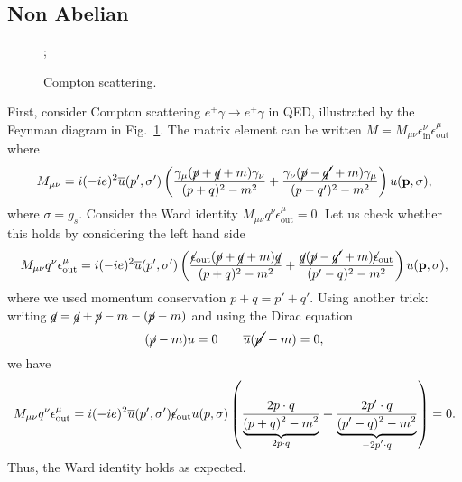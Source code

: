 
\subsection{Non Abelian}%
\label{sub:non_abelian}

\begin{figure}[tbhp]
  \centering
  ;
  \caption{Compton scattering.}
  \label{fig:compton}
\end{figure}
First, consider Compton scattering $e^+ \gamma \to e^+ \gamma$ in QED, illustrated by the Feynman diagram in Fig.~\ref{fig:compton}.
The matrix element can be written $M = M_{\mu\nu} \epsilon^{\nu}_{\text{in}} \epsilon^{\mu} _{\text{out}}$ where
\begin{equation}
  M_{\mu\nu} = i (-i e)^2 \overline{u}{}(p', \sigma') \left( \frac{\gamma_{\mu}(\cancel{p} + \cancel{q} + m)\gamma_{\nu}}{(p + q)^2 - m^2} + \frac{\gamma_{\nu}(\cancel{p} - \cancel{q'} + m)\gamma_{\mu}}{(p - q')^2 - m^2} \right) u(\vb{p}, \sigma),
\end{equation}
where $\sigma = g_s$.
Consider the Ward identity $M_{\mu\nu} q^{\nu} \epsilon^{\mu} _{\text{out}} = 0$.
Let us check whether this holds by considering the left hand side
\begin{equation}
  M_{\mu\nu} q^{\nu} \epsilon^{\mu} _{\text{out}} = i (-i e)^2 \overline{u}{}(p', \sigma') 
  \left( \frac{\cancel{\epsilon}_{\text{out}}(\cancel{p} + \cancel{q} + m)\cancel{q}}{(p + q)^2 - m^2} 
  + \frac{\cancel{q}(\cancel{p} - \cancel{q'} + m)\cancel{\epsilon}_{\text{out}}}{(p' - q)^2 - m^2} \right) u(\vb{p}, \sigma),
\end{equation}
where we used momentum conservation $p + q = p' + q'$.
Using another trick: writing $\cancel{q} = \cancel{q} + \cancel{p}-m - (\cancel{p} - m)$ and using the Dirac equation
\begin{equation}
  (\cancel{p} - m) u = 0 \qquad \overline{u}{} (\cancel{p'} - m) = 0,
\end{equation}
we have
\begin{equation}
  \label{eq:12-1}
  M_{\mu\nu} q^{\nu} \epsilon^{\mu} _{\text{out}} = i (-i e)^2 \overline{u}{}(p', \sigma') \cancel{\epsilon} _{\text{out}} u(p, \sigma) \left( \frac{2 p \cdot q}{\underbrace{(p + q)^2 - m^2}_{\mathclap{2 p \cdot q}}} + \frac{2 p' \cdot q}{\underbrace{(p' - q)^2 - m^2}_{\mathclap{-2 p' \cdot q}}} \right) = 0.
\end{equation}
Thus, the Ward identity holds as expected.

